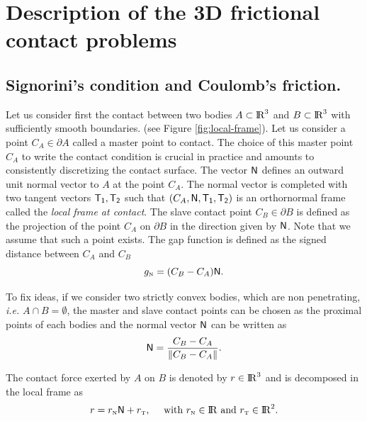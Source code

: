 \clearpage
\section{Description of the 3D frictional contact problems}
\label{sec:description}
\subsection{Signorini's condition and Coulomb's friction.}

Let us consider first the contact between two  bodies $A \subset  \mbox{l\hspace{ -.15em}R}^3$ and $B \subset \mbox{l\hspace{ -.15em}R}^3$ with sufficiently smooth boundaries. (see Figure \ref{fig:local-frame}). Let us consider a point $C_{A} \in \partial A$ called a master point to contact.  The choice of this master point $C_A$ to write the contact condition is crucial in  practice and amounts to consistently discretizing  the contact surface. The vector  ${\sf N}$ defines an outward unit normal vector to $A$ at the point $C_A$. The normal vector is completed with two tangent vectors $\sf T_1, T_2$ such that $(C_A, \sf N, T_1, T_2)$ is an orthornormal frame called the \textit{local frame at contact}. The slave contact point $C_B \in \partial B$ is defined as the projection of the point $C_A$ on $\partial B$ in the direction given by $\sf N$. Note that we assume that such a point exists. The gap function is defined as the signed distance between $C_A$ and $C_B$
\begin{equation}
  \label{eq:gap}
  g_{\n} = (C_B-C_A)  \sf N.
\end{equation}


To fix ideas, if we consider two strictly convex bodies, which are non penetrating, {\it i.e.}  $A \cap B = \emptyset$, the master and slave contact points can be chosen as the proximal points of each bodies and the normal vector  ${\sf N}$ can be written as
\begin{equation}
  \label{eq:normal}
  {\sf N} = \Frac{C_B-C_A}{\|C_B-C_A\|}.
\end{equation}



The contact force exerted by $A$ on $B$ is denoted by $r \in \mathrm{I\!R}^3$ and is decomposed in the local frame as
\begin{equation}
  \label{eq:reaction}
  r =  r_\n {\sf N} + r_\t, \quad \text{ with  } r_\n \in \RR \text{ and } r_\t \in \RR^2.
\end{equation}

